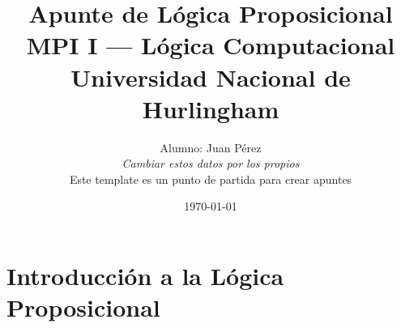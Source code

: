 \title{%
    {\huge \textbf{Apunte de Lógica Proposicional}} \\[0.5cm]
    {\large MPI I --- Lógica Computacional} \\
    {\large Universidad Nacional de Hurlingham}
}

\author{%
    Alumno: Juan Pérez \\[0.3cm]
    {\small \textit{Cambiar estos datos por los propios}} \\
    {\small Este template es un punto de partida para crear apuntes}
}

\date{\today}                   %

\maketitle

\thispagestyle{empty}  %
\newpage

\tableofcontents
\newpage


\section{Introducción a la Lógica Proposicional}

